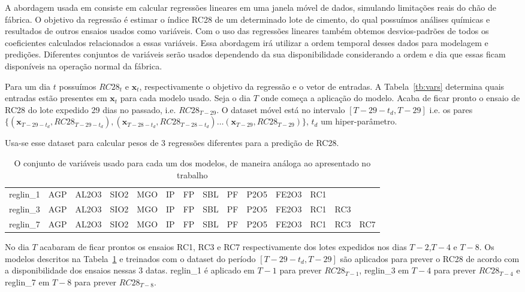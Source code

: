 A abordagem usada em \cite{grecialin} consiste em calcular regressões lineares em
uma janela móvel de dados, simulando limitações reais do chão de fábrica. O
objetivo da regressão é estimar o índice RC28 de um determinado lote de cimento,
do qual possuímos análises químicas e resultados de outros ensaios usados como
variáveis. Com o uso das regressões lineares também obtemos desvios-padrões de
todos os coeficientes calculados relacionados a essas variáveis. Essa abordagem irá utilizar a ordem temporal desses dados para
modelagem e predições. Diferentes conjuntos de variáveis serão usados dependendo
da sua disponibilidade considerando a ordem e dia que essas ficam disponíveis na
operação normal da fábrica.

Para um dia $t$ possuímos $RC28_t$ e $\textbf{x}_t$, respectivamente o objetivo
da regressão e o vetor de entradas. A Tabela~\ref{tb:vars} determina quais entradas estão presentes em $\textbf{x}_{t}$ para cada modelo usado.
Seja o dia $T$ onde começa a aplicação do modelo. Acaba de ficar pronto o ensaio
de RC28 do lote expedido 29 dias no passado, i.e. $RC28_{T-29}$.  O dataset móvel está no
intervalo $[T-29-t_d,T-29]$ i.e. os pares
$\{(\textbf{x}_{T-29-t_d},RC28_{T-29-t_d}), (\textbf{x}_{T-28-t_d},RC28_{T-28-t_d})
\dots (\textbf{x}_{T-29},RC28_{T-29})\}$, $t_d$ um hiper-parâmetro.

Usa-se esse dataset para calcular pesos de 3 regressões diferentes para a predição de RC28.


\begin{table}[]
  \centering 
  \begin{tabular}{llllllllllllll}
    \toprule
    reglin\_1 &  AGP &  AL2O3 &  SIO2 &  MGO &  IP &  FP &  SBL &  PF &  P2O5 &  FE2O3 &  RC1 &      &      \\
    reglin\_3 &  AGP &  AL2O3 &  SIO2 &  MGO &  IP &  FP &  SBL &  PF &  P2O5 &  FE2O3 &  RC1 &  RC3 &      \\
    reglin\_7 &  AGP &  AL2O3 &  SIO2 &  MGO &  IP &  FP &  SBL &  PF &  P2O5 &  FE2O3 &  RC1 &  RC3 &  RC7 \\
    \bottomrule
  \end{tabular}
  \caption{O conjunto de variáveis usado para cada um dos modelos, de maneira análoga ao apresentado no trabalho \cite{grecialin}}
  \label{tab:modelslin}
\end{table}


No dia $T$ acabaram de ficar prontos os ensaios RC1, RC3 e RC7 respectivamente
dos lotes expedidos nos dias $T-2$,$T-4$ e $T-8$. Os modelos descritos na 
Tabela~\ref{tab:modelslin} e treinados com o dataset do período 
$[T-29-t_d,T-29]$ são aplicados para prever o RC28 de acordo com a
disponibilidade dos ensaios nessas 3 datas. reglin\_1 é aplicado em $T-1$
para prever $RC28_{T-1}$,
reglin\_3 em $T-4$ para prever $RC28_{T-4}$ e reglin\_7 em $T-8$ para prever
$RC28_{T-8}$.


